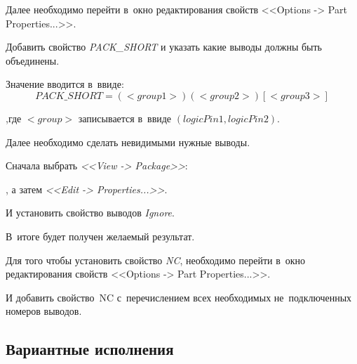 Далее необходимо перейти в~окно редактирования свойств <<Options -> Part Properties...>>.
	\begin{figure}[H]
	\end{figure}

Добавить свойство \textit{PACK\_SHORT} и указать какие выводы должны быть объединены. 
	\begin{figure}[H]
	\end{figure}
Значение вводится в~ввиде:
	\begin{equation}
		PACK\_SHORT = (<group1>)(<group2>)[<group3>]
	\end{equation}
	\begin{ESKDexplanation}
		\item[,где] $<group>$ записывается в~ввиде $(logicPin1, logicPin2)$.
	\end{ESKDexplanation}
	
Далее необходимо сделать невидимыми нужные выводы.

Сначала выбрать \textit{<<View -> Package>>}:
	\begin{figure}[H]
	\end{figure}
, а затем \textit{<<Edit -> Properties...>>}. 
	\begin{figure}[H]
	\end{figure}
И установить свойство выводов \textit{Ignore}.
	\begin{figure}[H]
	\end{figure}
В~итоге будет получен желаемый результат.

Для того чтобы установить свойство \textit{NC}, необходимо перейти в~окно редактирования свойств <<Options -> Part Properties...>>.
	 \begin{figure}[H]
	 \end{figure}
И добавить свойство~NC с~перечислением всех необходимых не~подключенных номеров выводов.
	\begin{figure}[H]
	\end{figure}
	
\newpage
\subsection{Вариантные исполнения} \label{ssec:variant_list}



